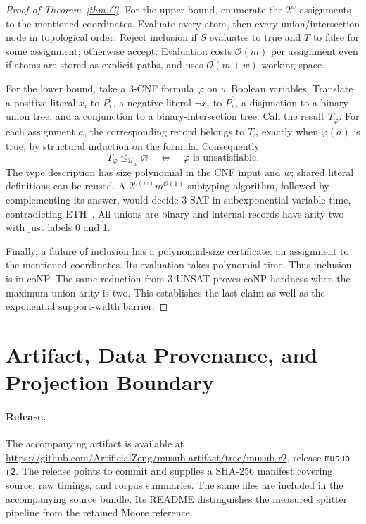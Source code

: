\documentclass[11pt,letterpaper]{article}
\theoremstyle{definition}\newtheorem{definition}[theorem]{Definition}
\newcommand{\Oh}{\mathcal O}
\begin{document}
\begin{proof}[Proof of Theorem~\ref{thm:C}]
For the upper bound, enumerate the $2^w$ assignments to the mentioned coordinates. Evaluate every atom, then every union/intersection node in topological order. Reject inclusion if $S$ evaluates to true and $T$ to false for some assignment; otherwise accept. Evaluation costs $\Oh(m)$ per assignment even if atoms are stored as explicit paths, and uses $\Oh(m+w)$ working space.

For the lower bound, take a 3-CNF formula $\varphi$ on $w$ Boolean variables. Translate a positive literal $x_i$ to $P_i^1$, a negative literal $\neg x_i$ to $P_i^0$, a disjunction to a binary-union tree, and a conjunction to a binary-intersection tree. Call the result $T_\varphi$. For each assignment $a$, the corresponding record belongs to $T_\varphi$ exactly when $\varphi(a)$ is true, by structural induction on the formula. Consequently
\[
 T_\varphi\le_{\mathcal U_w}\varnothing
 \quad\Longleftrightarrow\quad\varphi\text{ is unsatisfiable}.
\]
The type description has size polynomial in the CNF input and $w$; shared literal definitions can be reused. A $2^{o(w)}m^{\Oh(1)}$ subtyping algorithm, followed by complementing its answer, would decide 3-SAT in subexponential variable time, contradicting ETH~\cite{IP01}. All unions are binary and internal records have arity two with just labels 0 and 1.

Finally, a failure of inclusion has a polynomial-size certificate: an assignment to the mentioned coordinates. Its evaluation takes polynomial time. Thus inclusion is in coNP. The same reduction from 3-UNSAT proves coNP-hardness when the maximum union arity is two. This establishes the last claim as well as the exponential support-width barrier.
\end{proof}



\section{Artifact, Data Provenance, and Projection Boundary}\label{sec:artifact}
\paragraph{Release.}
The accompanying artifact is available at \url{https://github.com/ArtificialZeng/musub-artifact/tree/musub-r2}, release \texttt{musub-r2}. The release points to commit  and supplies a SHA-256 manifest covering source, raw timings, and corpus summaries. The same files are included in the accompanying source bundle. Its README distinguishes the measured splitter pipeline from the retained Moore reference.
\end{document}
